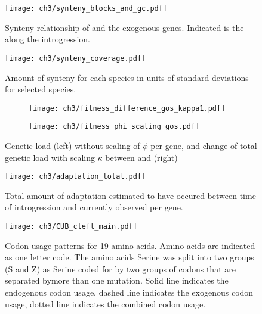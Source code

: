 \begin{figure}[H]
     \centering
	\texttt{[image: ch3/synteny\_blocks\_and\_gc.pdf]}
	\caption{Synteny relationship of \gossypii and the exogenous genes. Indicated is the \GC along the introgression.}
	\label{fig:synt_rel}
\end{figure}


\begin{figure}[H]
     \centering
	\texttt{[image: ch3/synteny\_coverage.pdf]}
	\caption{Amount of synteny for each species in units of standard deviations for selected species.}
	\label{fig:synteny_species}
\end{figure}



\begin{figure}[h]
    \centering
    \begin{subfigure}
        \centering
        \texttt{[image: ch3/fitness\_difference\_gos\_kappa1.pdf]}
    \end{subfigure}
    \begin{subfigure}
        \centering
        \texttt{[image: ch3/fitness\_phi\_scaling\_gos.pdf]}
    \end{subfigure}
    \caption{Genetic load (left) without scaling of $\phi$ per gene, and change of total genetic load with scaling $\kappa$ between \gossypii and \kluyveri (right)}
    \label{fig:sne_scaling}
\end{figure}

\begin{figure}[H]
     \centering
	\texttt{[image: ch3/adaptation\_total.pdf]}
	\caption{Total amount of adaptation estimated to have occured between time of introgression and currently observed per gene.}
	\label{fig:adapt_tot}
\end{figure}

\begin{figure}[H]
     \centering
	\texttt{[image: ch3/CUB\_cleft\_main.pdf]}
	\caption{Codon usage patterns for 19 amino acids. Amino acids are indicated as one letter code. 
	The amino acids Serine was split into two groups (S and Z) as Serine coded for by two groups of codons that are separated bymore than one mutation.
	Solid line indicates the endogenous codon usage, dashed line indicates the exogenous codon usage, dotted line indicates the combined codon usage.}
	\label{fig:cub_all_sets}
\end{figure}
